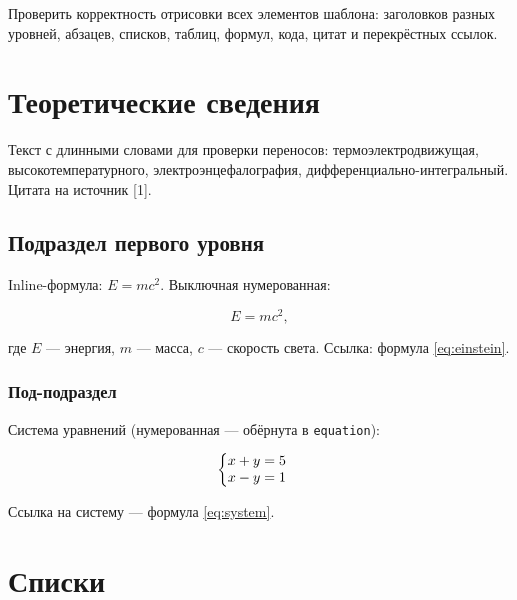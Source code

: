 \documentclass[a4paper,14pt]{extarticle}
\makeatletter
\renewenvironment{cases}{%
  \left\lbrace
  \begin{array}{@{}l@{\quad}l@{}}
}{%
  \end{array}\right.
}
\makeatother
\begin{document}
Проверить корректность отрисовки всех элементов шаблона: заголовков
разных уровней, абзацев, списков, таблиц, формул, кода, цитат и
перекрёстных ссылок.

\clearpage

\section{Теоретические сведения}\label{sec:theory}

Текст с длинными словами для проверки переносов: термоэлектродвижущая,
высокотемпературного, электроэнцефалография,
дифференциально-интегральный. Цитата на источник {[}1{]}.

\subsection{Подраздел первого
уровня}\label{ux43fux43eux434ux440ux430ux437ux434ux435ux43b-ux43fux435ux440ux432ux43eux433ux43e-ux443ux440ux43eux432ux43dux44f}

Inline-формула: \(E = mc^2\). Выключная нумерованная:

\begin{equation}\label{eq:einstein}
E = mc^2,
\end{equation}

где \(E\) --- энергия, \(m\) --- масса, \(c\) --- скорость света.
Ссылка: формула \eqref{eq:einstein}.

\subsubsection{Под-подраздел}\label{ux43fux43eux434-ux43fux43eux434ux440ux430ux437ux434ux435ux43b}

Система уравнений (нумерованная --- обёрнута в \texttt{equation}):

\begin{equation}\label{eq:system}
\begin{cases}
x + y = 5 \\
x - y = 1
\end{cases}
\end{equation}

Ссылка на систему --- формула \eqref{eq:system}.

\clearpage

\section{Списки}\label{ux441ux43fux438ux441ux43aux438}
\end{document}
